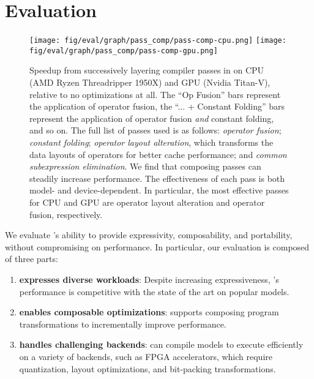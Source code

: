 \section{Evaluation}
\label{sec:eval}

%
%
%

\begin{figure*}[htp!]
  \centering
  \texttt{[image: fig/eval/graph/pass\_comp/pass-comp-cpu.png]}
  \texttt{[image: fig/eval/graph/pass\_comp/pass-comp-gpu.png]}
  \caption{\textmd{
    Speedup from successively layering compiler passes in \relay on CPU
    (AMD Ryzen Threadripper 1950X) and GPU (Nvidia Titan-V),
      relative to no optimizations at all.
    The ``Op Fusion'' bars represent the application of operator fusion,
      the ``... + Constant Folding'' bars represent the application of operator fusion \textit{and} constant folding,
      and so on.
    The full list of passes used is as follows:
      \textit{operator fusion};
      \textit{constant folding};
      \textit{operator layout alteration}, which transforms the data layouts of operators for better cache performance;
      and \textit{common subexpression elimination}.
    We find that composing passes can steadily increase performance.
    The effectiveness of each pass is both model- and device-dependent.
    In particular,
      the most effective passes for CPU and GPU are operator layout alteration and operator fusion,
      respectively.
  }}
  \label{fig:composability-eval}
\end{figure*}

We evaluate \relay's ability to provide expressivity, composability, and portability,
  without compromising on performance.
In particular, our evaluation is composed of three parts:
\begin{enumerate}
  \item \textbf{\relay expresses diverse workloads}: Despite increasing
    expressiveness, \relay's performance is competitive with the
    state of the art on popular models.
  \item \textbf{\relay enables composable optimizations}: \relay
    supports composing program transformations to incrementally improve performance.
  \item \textbf{\relay handles challenging backends}: \relay can compile
    models to execute efficiently on a variety of
    backends, such as FPGA accelerators, which require quantization, layout
    optimizations, and bit-packing transformations.
\end{enumerate}

